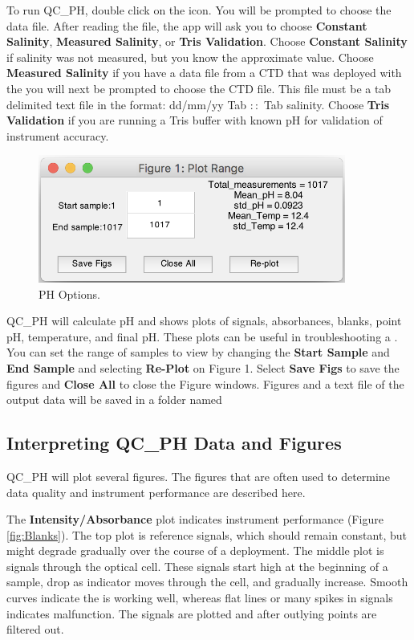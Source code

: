 To run QC\_PH, double click on the icon. You will be prompted to choose the \instType{} data file.  After reading the file, the app will ask you to choose \textbf{Constant Salinity}, \textbf{Measured Salinity}, or \textbf{Tris Validation}.  Choose \textbf{Constant Salinity} if salinity was not measured, but you know the approximate value.  Choose \textbf{Measured Salinity} if you have a data file from a CTD that was deployed with the \instType{} you will next be prompted to choose the CTD file.  This file must be a tab delimited text file in the format: dd/mm/yy Tab $\colon$$\colon$ Tab salinity.  Choose \textbf{Tris Validation} if you are running a Tris buffer with known pH for validation of instrument accuracy.

\begin{figure}
\centering
\includegraphics[width=0.9\textwidth]{figs/Plot_Range.png}
\caption{PH Options.}
\label{fig:Options}
\end{figure}

QC\_PH will calculate pH and shows plots of signals, absorbances, blanks, point pH, temperature, and final pH.  These plots can be useful in troubleshooting a \instType{}.  You can set the range of samples to view by changing the \textbf{Start Sample} and \textbf{End Sample} and selecting \textbf{Re-Plot} on Figure 1. Select \textbf{Save Figs} to save the figures and \textbf{Close All} to close the Figure windows.  Figures and a text file of the output data will be saved in a folder named 

\subsection{Interpreting QC\_PH Data and Figures}
QC\_PH will plot several figures.  The figures that are often used to determine data quality and instrument performance are described here.  

The \textbf{Intensity/Absorbance} plot indicates instrument performance (Figure \ref{fig:Blanks}).  The top plot is reference signals, which should remain constant, but might degrade gradually over the course of a deployment.  The middle plot is signals through the optical cell.  These signals start high at the beginning of a sample, drop as indicator moves through the cell, and gradually increase.  Smooth curves indicate the \instType{} is working well, whereas flat lines or many spikes in signals indicates malfunction. The signals are plotted  and after outlying points are filtered out.

